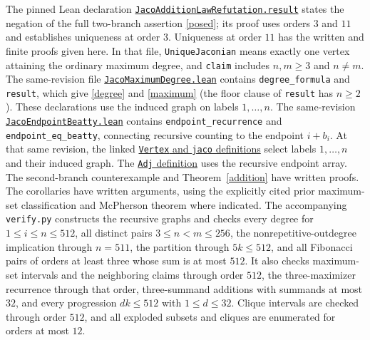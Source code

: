 \documentclass[11pt]{article}
\begin{document}
The pinned Lean declaration
\href{https://github.com/the-omega-institute/trureturing/blob/3bedf2870aacc6e7f17353444aadaa49fb73157c/D5/S3/ConceptDynamics/GraphColoring/JacoAdditionLawRefutation.lean}{\texttt{JacoAdditionLawRefutation.result}}
states the negation of the full two-branch assertion \eqref{posed}; its
proof uses orders $3$ and $11$ and establishes uniqueness at order $3$.
Uniqueness at order $11$ has the written and finite proofs given here.
In that file, \texttt{UniqueJaconian}
means exactly one vertex attaining the ordinary maximum degree, and
\texttt{claim} includes $n,m\ge3$ and $n\ne m$.
The same-revision file
\href{https://github.com/the-omega-institute/trureturing/blob/3bedf2870aacc6e7f17353444aadaa49fb73157c/D5/S3/ConceptDynamics/GraphColoring/JacoMaximumDegree.lean}{\texttt{JacoMaximumDegree.lean}}
contains \texttt{degree\_formula} and \texttt{result}, which give
\eqref{degree} and \eqref{maximum} (the floor clause of \texttt{result}
has $n\ge2$). These declarations use the induced graph on labels $1,\ldots,n$.
The same-revision
\href{https://github.com/the-omega-institute/trureturing/blob/3bedf2870aacc6e7f17353444aadaa49fb73157c/D5/S3/ConceptDynamics/GraphColoring/JacoEndpointBeatty.lean}{\texttt{JacoEndpointBeatty.lean}}
contains \texttt{endpoint\_recurrence} and \texttt{endpoint\_eq\_beatty},
connecting recursive counting to the endpoint $i+b_i$.
At that same revision, the linked
\href{https://github.com/the-omega-institute/trureturing/blob/3bedf2870aacc6e7f17353444aadaa49fb73157c/D5/S3/ConceptDynamics/GraphColoring/JacoDomPathDiameterRefutation.lean}{\texttt{Vertex} and \texttt{jaco} definitions}
select labels $1,\ldots,n$ and their induced graph.
The \href{https://github.com/the-omega-institute/trureturing/blob/3bedf2870aacc6e7f17353444aadaa49fb73157c/D5/S0/Certificates/JacoExponentialDominationRefutation.lean}{\texttt{Adj} definition}
uses the recursive endpoint array.
The second-branch counterexample and Theorem~\ref{addition} have written proofs.
The corollaries have written arguments, using the explicitly cited prior
maximum-set classification and McPherson theorem where indicated.
The accompanying \texttt{verify.py} constructs the recursive graphs and
checks every degree for $1\le i\le n\le512$, all distinct pairs
$3\le n<m\le256$, the nonrepetitive-outdegree implication through
$n=511$, the partition through $5k\le512$, and all Fibonacci pairs
of orders at least three whose sum is at most $512$.
It also checks maximum-set intervals and the neighboring claims through
order $512$, the three-maximizer recurrence through that order,
three-summand additions with summands at most $32$,
and every progression $dk\le512$ with $1\le d\le32$.
Clique intervals are checked through order $512$, and all exploded
subsets and cliques are enumerated for orders at most $12$.
\end{document}
